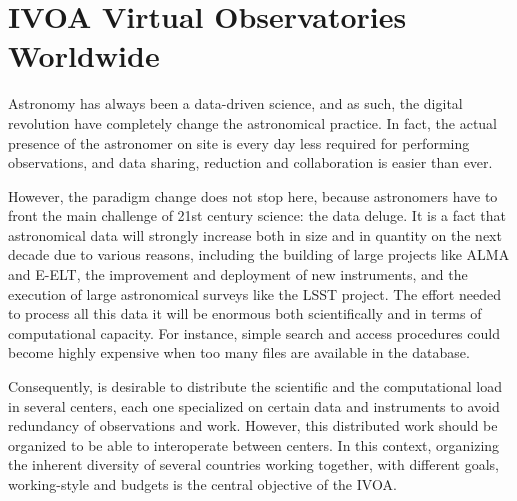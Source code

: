 \section{IVOA Virtual Observatories Worldwide}

Astronomy has always been a data-driven science, and as such, 
the digital revolution have completely change the astronomical practice.
In fact, the actual presence of the astronomer on site is every
day less required for performing observations, and data sharing, reduction
and collaboration is easier than ever. 

However, the paradigm change 
does not stop here, because astronomers have to front the main challenge of
21st century science: the data deluge. It is a fact that astronomical data will
strongly increase both in size and in quantity on the next decade due to various
reasons, including the building of large projects like ALMA and E-ELT, 
the improvement and deployment of new instruments, and the execution of 
large astronomical surveys like the LSST project.
The effort needed to process all this data it will be enormous both
scientifically and in terms of computational capacity. 
For instance, simple search and access procedures could become highly expensive
when too many files are available in the database.

Consequently, is desirable to distribute the scientific and the computational 
load in several centers, each one specialized on certain data and instruments
to avoid redundancy of observations and work. However, this distributed work
should be organized to be able to interoperate between centers.
In this context, organizing the inherent diversity of several countries working together, 
with different goals, working-style and budgets is the central objective of
the IVOA.


